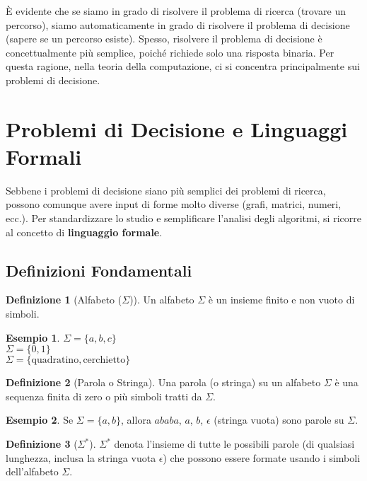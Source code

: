 \documentclass[a4paper]{article}
\theoremstyle{definition} %
\newtheorem{definition}{Definizione}
\newtheorem{example}{Esempio}
\begin{document}
È evidente che se siamo in grado di risolvere il problema di ricerca (trovare un percorso), siamo automaticamente in grado di risolvere il problema di decisione (sapere se un percorso esiste). Spesso, risolvere il problema di decisione è concettualmente più semplice, poiché richiede solo una risposta binaria. Per questa ragione, nella teoria della computazione, ci si concentra principalmente sui problemi di decisione.

\section{Problemi di Decisione e Linguaggi Formali}

Sebbene i problemi di decisione siano più semplici dei problemi di ricerca, possono comunque avere input di forme molto diverse (grafi, matrici, numeri, ecc.). Per standardizzare lo studio e semplificare l'analisi degli algoritmi, si ricorre al concetto di \textbf{linguaggio formale}.

\subsection{Definizioni Fondamentali}

\begin{definition}[Alfabeto ($\Sigma$)]
Un alfabeto $\Sigma$ è un insieme finito e non vuoto di simboli.
\end{definition}
\begin{example}
$\Sigma = \{a, b, c\}$ \\
$\Sigma = \{0, 1\}$ \\
$\Sigma = \{\text{quadratino}, \text{cerchietto}\}$
\end{example}

\begin{definition}[Parola o Stringa]
Una parola (o stringa) su un alfabeto $\Sigma$ è una sequenza finita di zero o più simboli tratti da $\Sigma$.
\end{definition}
\begin{example}
Se $\Sigma = \{a, b\}$, allora $ababa$, $a$, $b$, $\epsilon$ (stringa vuota) sono parole su $\Sigma$.
\end{example}

\begin{definition}[$\Sigma^*$]
$\Sigma^*$ denota l'insieme di tutte le possibili parole (di qualsiasi lunghezza, inclusa la stringa vuota $\epsilon$) che possono essere formate usando i simboli dell'alfabeto $\Sigma$.
\end{definition}
\end{document}
